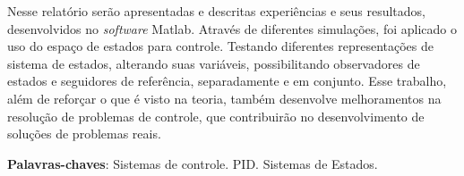 \documentclass[
	12pt,				%
	openany,			%
	oneside,			%
	a4paper,			%
	english,			%
	french,				%
	spanish,			%
	brazil,				%
	]{abntex2}
\begin{document}

\frenchspacing 


\imprimircapa

\imprimirfolhaderosto*


{
\ABNTEXchapterfont



\setlength{\absparsep}{18pt} %
\begin{resumo}
	
Nesse relatório serão apresentadas e descritas experiências e seus resultados, desenvolvidos no \textit{software} Matlab. Através de diferentes simulações, foi aplicado o uso do espaço de estados para controle. Testando diferentes representações de sistema de estados, alterando suas variáveis, possibilitando observadores de estados e seguidores de referência, separadamente e em conjunto. Esse trabalho, além de reforçar o que é visto na teoria, também desenvolve melhoramentos na resolução de problemas de controle, que contribuirão no desenvolvimento de soluções de problemas reais.


 \noindent
 \textbf{Palavras-chaves}: Sistemas de controle. PID. Sistemas de Estados.
\end{resumo}

\listoffigures*
\cleardoublepage

\listoftables*
\cleardoublepage


}
\end{document}
